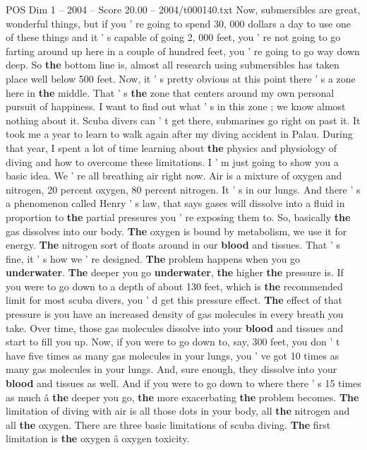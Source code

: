 \begin{textsample}{POS Dim 1 – 2004 – Score 20.00 – 2004/t000140.txt}
Now, submersibles are great, wonderful things, but if you ' re going to spend 30, 000 dollars a day to use one of these things and it ' s capable of going 2, 000 feet, you ' re not going to go farting around up here in a couple of hundred feet, you ' re going to go way down deep.
So \textbf{the} bottom line is, almost all research using submersibles has taken place well below 500 feet.
Now, it ' s pretty obvious at this point there ' s a zone here in \textbf{the} middle.
That ' s \textbf{the} zone that centers around my own personal pursuit of happiness.
I want to find out what ' s in this zone ; we know almost nothing about it.
Scuba divers can ' t get there, submarines go right on past it.
It took me a year to learn to walk again after my diving accident in Palau.
During that year, I spent a lot of time learning about \textbf{the} physics and physiology of diving and how to overcome these limitations.
I ' m just going to show you a basic idea.
We ' re all breathing air right now.
Air is a mixture of oxygen and nitrogen, 20 percent oxygen, 80 percent nitrogen.
It ' s in our lungs.
And there ' s a phenomenon called Henry ' s law, that says gases will dissolve into a fluid in proportion to \textbf{the} partial pressures you ' re exposing them to.
So, basically \textbf{the} gas dissolves into our body. \textbf{The} oxygen is bound by metabolism, we use it for energy. \textbf{The} nitrogen sort of floats around in our \textbf{blood} and tissues.
That ' s fine, it ' s how we ' re designed. \textbf{The} problem happens when you go \textbf{underwater}. \textbf{The} deeper you go \textbf{underwater}, \textbf{the} higher \textbf{the} pressure is.
If you were to go down to a depth of about 130 feet, which is \textbf{the} recommended limit for most scuba divers, you ' d get this pressure effect. \textbf{The} effect of that pressure is you have an increased density of gas molecules in every breath you take.
Over time, those gas molecules dissolve into your \textbf{blood} and tissues and start to fill you up.
Now, if you were to go down to, say, 300 feet, you don ' t have five times as many gas molecules in your lungs, you ' ve got 10 times as many gas molecules in your lungs.
And, sure enough, they dissolve into your \textbf{blood} and tissues as well.
And if you were to go down to where there ' s 15 times as much â \textbf{the} deeper you go, \textbf{the} more exacerbating \textbf{the} problem becomes. \textbf{The} limitation of diving with air is all those dots in your body, all \textbf{the} nitrogen and all \textbf{the} oxygen.
There are three basic limitations of scuba diving. \textbf{The} first limitation is \textbf{the} oxygen â oxygen toxicity.

\end{textsample}
